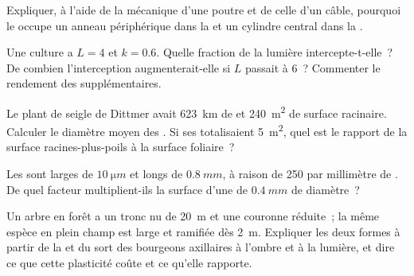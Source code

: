 \begin{exercise}[$\star\star$]\label{exo:b1:flowering-plant-organization:6}
Expliquer, à l'aide de la mécanique d'une poutre et de celle d'un câble,
pourquoi le  occupe un anneau périphérique dans la 
et un cylindre central dans la .
\end{exercise}

\begin{exercise}[$\star\star$]\label{exo:b1:flowering-plant-organization:7}
Une culture a $L = 4$ et $k = 0.6$. Quelle fraction de la lumière
intercepte-t-elle~? De combien l'interception augmenterait-elle si $L$
passait à 6~? Commenter le rendement des  supplémentaires.
\end{exercise}

\begin{exercise}[$\star\star$]\label{exo:b1:flowering-plant-organization:8}
Le plant de seigle de Dittmer avait \qty{623}{km} de  et
\qty{240}{m^2} de surface racinaire. Calculer le diamètre moyen des
. Si ses  totalisaient \qty{5}{m^2}, quel est le rapport
de la surface racines-plus-poils à la surface foliaire~?
\end{exercise}

\begin{exercise}[$\star\star$]\label{exo:b1:flowering-plant-organization:9}
Les  sont larges de $\qty{10}{\micro m}$ et longs de
$\qty{0.8}{mm}$, à raison de \qty{250}{} par millimètre de . De
quel facteur multiplient-ils la surface d'une  de
$\qty{0.4}{mm}$ de diamètre~?
\end{exercise}

\begin{exercise}[$\star\star\star$]\label{exo:b1:flowering-plant-organization:10}
Un arbre en forêt a un tronc nu de \qty{20}{m} et une couronne réduite~;
la même espèce en plein champ est large et ramifiée dès \qty{2}{m}.
Expliquer les deux formes à partir de la  et du sort
des bourgeons axillaires à l'ombre et à la lumière, et dire ce que cette
plasticité coûte et ce qu'elle rapporte.
\end{exercise}


